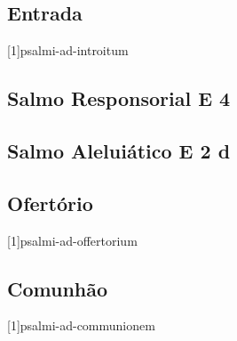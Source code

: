 
\subsection{Entrada}\label{subsection:missae-votivae/missa-votiva-de-spiritu-sancto/introitus}
[1]{psalmi-ad-introitum}

\subsection{Salmo Responsorial \textmd{E 4}}\label{subsection:missae-votivae/missa-votiva-de-spiritu-sancto/psalmus-responsorius}

\AllowPageFlush

\subsection{Salmo Aleluiático \textmd{E 2 d}}\label{subsection:missae-votivae/missa-votiva-de-spiritu-sancto/psalmus-alleluiaticus}

\AllowPageFlush

\subsection{Ofertório}\label{subsection:missae-votivae/missa-votiva-de-spiritu-sancto/offertorium}
[1]{psalmi-ad-offertorium}

\AllowPageFlush

\subsection{Comunhão}\label{subsection:missae-votivae/missa-votiva-de-spiritu-sancto/communio}
[1]{psalmi-ad-communionem}
